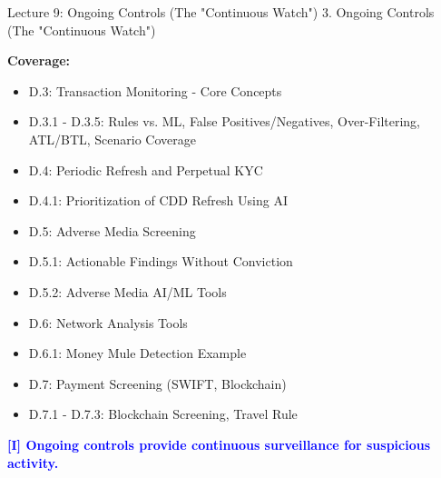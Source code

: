 \documentclass[11pt,a4paper]{beamer}
\newcommand{\bluenote}[1]{\textcolor{blue}{\textbf{[I] #1}}}
\begin{document}

\begin{frame}{Lecture 9: Ongoing Controls (The "Continuous Watch")}
	\centering
	\Large 3. Ongoing Controls (The "Continuous Watch")
	\vspace{0.5cm}
	
	\textbf{Coverage:}
	\begin{itemize}
		\item D.3: Transaction Monitoring - Core Concepts
		\item D.3.1 - D.3.5: Rules vs. ML, False Positives/Negatives, Over-Filtering, ATL/BTL, Scenario Coverage
		\item D.4: Periodic Refresh and Perpetual KYC
		\item D.4.1: Prioritization of CDD Refresh Using AI
		\item D.5: Adverse Media Screening
		\item D.5.1: Actionable Findings Without Conviction
		\item D.5.2: Adverse Media AI/ML Tools
		\item D.6: Network Analysis Tools
		\item D.6.1: Money Mule Detection Example
		\item D.7: Payment Screening (SWIFT, Blockchain)
		\item D.7.1 - D.7.3: Blockchain Screening, Travel Rule
	\end{itemize}
	\bluenote{Ongoing controls provide continuous surveillance for suspicious activity.}
\end{frame}

\end{document}
